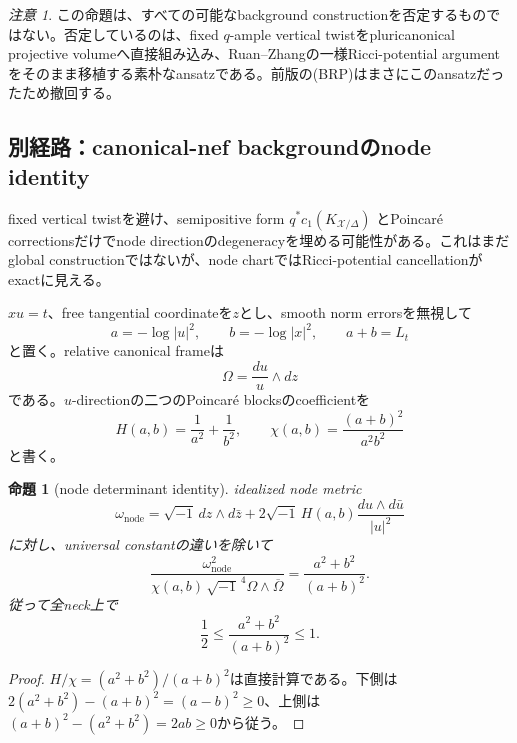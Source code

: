 \documentclass[11pt,a4paper]{ltjsarticle}
\newtheorem{proposition}[theorem]{命題}
\theoremstyle{definition}
\theoremstyle{remark}
\newtheorem{remark}[theorem]{注意}
\begin{document}
\begin{remark}
この命題は、すべての可能なbackground constructionを否定するものではない。否定しているのは、fixed $q$-ample vertical twistをpluricanonical projective volumeへ直接組み込み、Ruan--Zhangの一様Ricci-potential argumentをそのまま移植する素朴なansatzである。前版の\textup{(BRP)}はまさにこのansatzだったため撤回する。
\end{remark}

\subsection{別経路：canonical-nef backgroundのnode identity}

fixed vertical twistを避け、semipositive form $q^*c_1(K_{\mathcal X/\Delta})$ とPoincaré correctionsだけでnode directionのdegeneracyを埋める可能性がある。これはまだglobal constructionではないが、node chartではRicci-potential cancellationがexactに見える。

$xu=t$、free tangential coordinateを$z$とし、smooth norm errorsを無視して
\[
 a=-\log|u|^2,\qquad b=-\log|x|^2,\qquad a+b=L_t
\]
と置く。relative canonical frameは
\[
 \Omega=\frac{du}{u}\wedge dz
\]
である。$u$-directionの二つのPoincaré blocksのcoefficientを
\[
 H(a,b)=\frac1{a^2}+\frac1{b^2},
 \qquad
 \chi(a,b)=\frac{(a+b)^2}{a^2b^2}
\]
と書く。

\begin{proposition}[node determinant identity]\label{prop:node-determinant-identity}
idealized node metric
\begin{equation}\label{eq:nef-poincare-node-model}
 \omega_{\mathrm{node}}
 =\sqrt{-1}\,dz\wedge d\bar z
 +2\sqrt{-1}\,H(a,b)\frac{du\wedge d\bar u}{|u|^2}
\end{equation}
に対し、universal constantの違いを除いて
\begin{equation}\label{eq:node-volume-ratio}
 \frac{\omega_{\mathrm{node}}^2}
 {\chi(a,b)\,\sqrt{-1}^{\,4}\Omega\wedge\overline\Omega}
 =\frac{a^2+b^2}{(a+b)^2}.
\end{equation}
従って全neck上で
\begin{equation}\label{eq:node-ratio-bounds}
 \frac12\le
 \frac{a^2+b^2}{(a+b)^2}
 \le1.
\end{equation}
\end{proposition}

\begin{proof}
$H/\chi=(a^2+b^2)/(a+b)^2$は直接計算である。下側は
$2(a^2+b^2)-(a+b)^2=(a-b)^2\ge0$、上側は
$(a+b)^2-(a^2+b^2)=2ab\ge0$から従う。
\end{proof}
\end{document}
